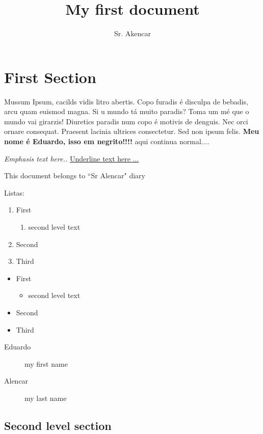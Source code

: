 \documentclass{article}
\title{My first document}
\author{Sr. Akencar}
\date{}
\begin{document}
\maketitle

\section{First Section}

Mussum Ipsum, cacilds vidis litro abertis. Copo furadis é disculpa de bebadis, arcu quam euismod magna. Si u mundo tá muito paradis? Toma um mé que o mundo vai girarzis! Diuretics paradis num copo é motivis de denguis. Nec orci ornare consequat. Praesent lacinia ultrices consectetur. Sed non ipsum felis. \textbf{Meu nome é Eduardo, isso em negrito!!!!} aqui continua normal....

\emph{Emphasis text here..} \underline {Underline text here ...}

This document belongs to ``Sr Alencar" diary

Listas:

\begin{enumerate}
\item First
\begin{enumerate}
\item{second level text}
\end{enumerate}

\item Second
\item Third

\end{enumerate}

\begin{itemize}
\item First
\begin{itemize}
\item{second level text}
\end{itemize}

\item Second
\item Third

\end{itemize}

\begin{description}
\item [Eduardo] my first name
\item [Alencar] my last name
\end{description}



\subsection{Second level section}
\end{document}
